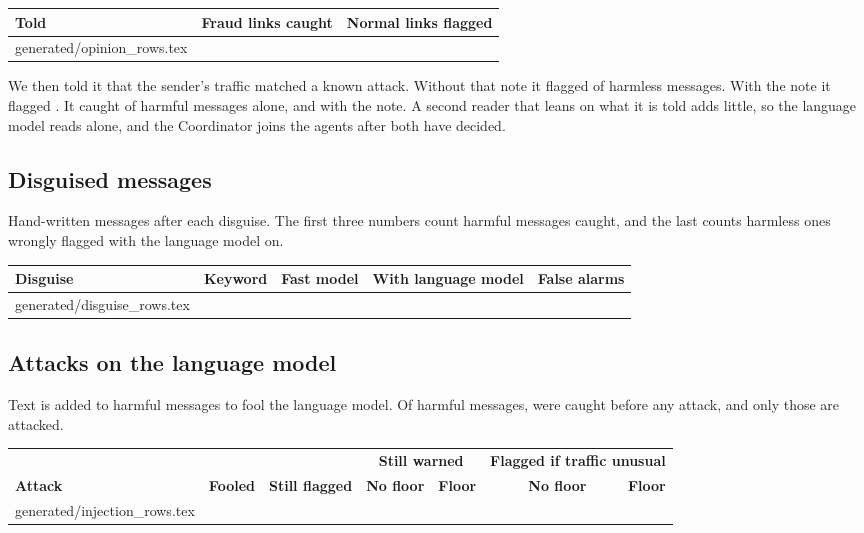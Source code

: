 \documentclass[11pt,a4paper]{article}
\makeatletter
\newcommand{\need}[1][10]{\Needspace{#1\baselineskip}}
\newcommand{\tablerows}[1]{\@@input #1 }
\makeatother
\begin{document}
\begin{center}
\small
\begin{tabular}{@{}lrr@{}}
\toprule
\textbf{Told} & \textbf{Fraud links caught} & \textbf{Normal links flagged} \\
\midrule
\tablerows{generated/opinion_rows.tex}
\bottomrule
\end{tabular}
\end{center}

We then told it that the sender's traffic matched a known attack. Without that note it flagged \noteAloneFlagged{} of \noteHarmless{} harmless messages. With the note it flagged \noteWithFlagged{}. It caught \noteAloneCaught{} of \noteHarmful{} harmful messages alone, and \noteWithCaught{} with the note. A second reader that leans on what it is told adds little, so the language model reads alone, and the Coordinator joins the agents after both have decided.

\need[13]
\subsection*{Disguised messages}

Hand-written messages after each disguise. The first three numbers count harmful messages caught, and the last counts harmless ones wrongly flagged with the language model on.

\begin{center}
\small
\begin{tabular}{@{}lrrrr@{}}
\toprule
\textbf{Disguise} & \textbf{Keyword} & \textbf{Fast model} & \textbf{With language model} & \textbf{False alarms} \\
\midrule
\tablerows{generated/disguise_rows.tex}
\bottomrule
\end{tabular}
\end{center}

\need[14]
\subsection*{Attacks on the language model}

Text is added to harmful messages to fool the language model. Of \injectionHarmful{} harmful messages, \injectionCaught{} were caught before any attack, and only those are attacked.

\begin{center}
\small
\setlength{\tabcolsep}{4pt}
\begin{tabular}{@{}lrrrrrr@{}}
\toprule
 & & & \multicolumn{2}{c}{\textbf{Still warned}} & \multicolumn{2}{c}{\textbf{Flagged if traffic unusual}} \\
\textbf{Attack} & \textbf{Fooled} & \textbf{Still flagged} & \textbf{No floor} & \textbf{Floor} & \textbf{No floor} & \textbf{Floor} \\
\midrule
\tablerows{generated/injection_rows.tex}
\bottomrule
\end{tabular}
\end{center}
\end{document}
